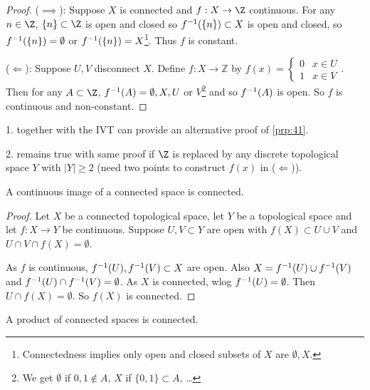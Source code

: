 \begin{proof}
($\implies$): Suppose $X$ is connected and $f:X\to \Z$ continuous. For any $n\in \Z$, $\set{n}\subset \Z$ is open and closed so $f^{-1}(\{n\})\subset X$ is open and closed, so $f^{-1}(\{n\})= \emptyset$ or $f^{-1}(\{n\}) = X$\footnote{Connectedness implies only open and closed subsets of $X$ are $\emptyset, X$.}. Thus $f$ is constant.

($\Longleftarrow$): Suppose $U,V$ disconnect $X$. Define $f:X \to \mathbb{Z}$ by $f(x) = \begin{cases}
    0 & x \in U \\
    1 & x \in V
\end{cases}$. 
Then for any $A\subset \Z$, $f^{-1}(A) = \emptyset,X,U$ or $V$\footnote{We get $\emptyset$ if $0, 1 \notin A$, $X$ if $\{0, 1\} \subset A$, \dots} and so $f^{-1}(A)$ is open. So $f$ is continuous and non-constant.
\end{proof}

\begin{remark}
1.  together with the IVT can provide an alternative proof of \cref{prp:41}.

2.  remains true with same proof if $\Z$ is replaced by any discrete topological space $Y$ with $|Y| \geq 2$ (need two points to construct $f(x)$ in ($\Longleftarrow$)).
\end{remark}

\begin{proposition} \label{prp:43}
A continuous image of a connected space is connected.
\end{proposition}
\begin{proof}
Let $X$ be a connected topological space, let $Y$ be a topological space and let $f:X\to Y$ be continuous. Suppose $U,V\subset Y$ are open with $f(X)\subset U\cup V$ and $U\cap V\cap f(X) = \emptyset$.

As $f$ is continuous, $f^{-1}(U),f^{-1}(V)\subset X$ are open. Also $X = f^{-1}(U)\cup f^{-1}(V)$ and $f^{-1}(U) \cap f^{-1}(V)=\emptyset$. As $X$ is connected, wlog $f^{-1}(U)= \emptyset$. Then $U \cap f(X)=\emptyset$. So $f(X)$ is connected.
\end{proof}

\begin{proposition} \label{prp:44}
A product of connected spaces is connected.
\end{proposition}

